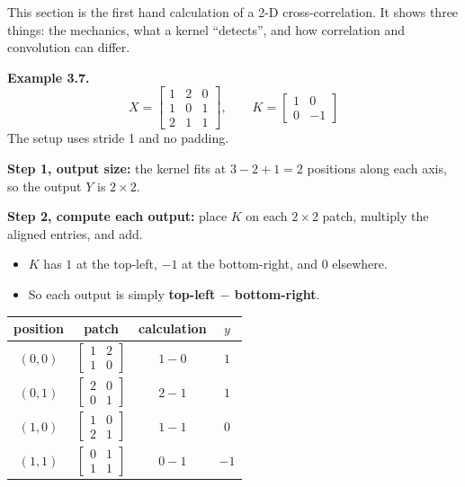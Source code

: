 This section is the first hand calculation of a 2-D cross-correlation. It shows three things: the mechanics, what a kernel ``detects'', and how correlation and convolution can differ.

\textbf{Example 3.7.}
\[
X = \begin{bmatrix} 1 & 2 & 0 \\ 1 & 0 & 1 \\ 2 & 1 & 1 \end{bmatrix},
\qquad
K = \begin{bmatrix} 1 & 0 \\ 0 & -1 \end{bmatrix}
\]
The setup uses stride 1 and no padding.

\textbf{Step 1, output size:} the kernel fits at $3 - 2 + 1 = 2$ positions along each axis, so the output $Y$ is $2 \times 2$.

\textbf{Step 2, compute each output:} place $K$ on each $2 \times 2$ patch, multiply the aligned entries, and add.
\begin{itemize}
  \item $K$ has $1$ at the top-left, $-1$ at the bottom-right, and $0$ elsewhere.
  \item So each output is simply \textbf{top-left $-$ bottom-right}.
\end{itemize}

\begin{center}
\begin{tabular}{cccc}
\toprule
position & patch & calculation & $y$ \\
\midrule
$(0,0)$ & $\begin{bmatrix} 1 & 2 \\ 1 & 0 \end{bmatrix}$ & $1 - 0$ & $1$ \\[8pt]
$(0,1)$ & $\begin{bmatrix} 2 & 0 \\ 0 & 1 \end{bmatrix}$ & $2 - 1$ & $1$ \\[8pt]
$(1,0)$ & $\begin{bmatrix} 1 & 0 \\ 2 & 1 \end{bmatrix}$ & $1 - 1$ & $0$ \\[8pt]
$(1,1)$ & $\begin{bmatrix} 0 & 1 \\ 1 & 1 \end{bmatrix}$ & $0 - 1$ & $-1$ \\
\bottomrule
\end{tabular}
\end{center}

